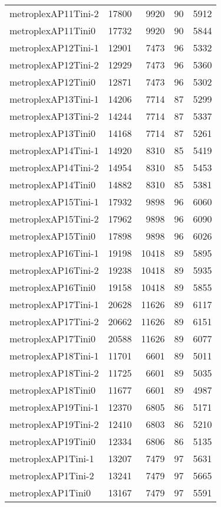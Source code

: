 \begin{longtable}{lrrrr}
metroplexAP11Tini-2 & 17800 & 9920 & 90 & 5912 \\
metroplexAP11Tini0 & 17732 & 9920 & 90 & 5844 \\
metroplexAP12Tini-1 & 12901 & 7473 & 96 & 5332 \\
metroplexAP12Tini-2 & 12929 & 7473 & 96 & 5360 \\
metroplexAP12Tini0 & 12871 & 7473 & 96 & 5302 \\
metroplexAP13Tini-1 & 14206 & 7714 & 87 & 5299 \\
metroplexAP13Tini-2 & 14244 & 7714 & 87 & 5337 \\
metroplexAP13Tini0 & 14168 & 7714 & 87 & 5261 \\
metroplexAP14Tini-1 & 14920 & 8310 & 85 & 5419 \\
metroplexAP14Tini-2 & 14954 & 8310 & 85 & 5453 \\
metroplexAP14Tini0 & 14882 & 8310 & 85 & 5381 \\
metroplexAP15Tini-1 & 17932 & 9898 & 96 & 6060 \\
metroplexAP15Tini-2 & 17962 & 9898 & 96 & 6090 \\
metroplexAP15Tini0 & 17898 & 9898 & 96 & 6026 \\
metroplexAP16Tini-1 & 19198 & 10418 & 89 & 5895 \\
metroplexAP16Tini-2 & 19238 & 10418 & 89 & 5935 \\
metroplexAP16Tini0 & 19158 & 10418 & 89 & 5855 \\
metroplexAP17Tini-1 & 20628 & 11626 & 89 & 6117 \\
metroplexAP17Tini-2 & 20662 & 11626 & 89 & 6151 \\
metroplexAP17Tini0 & 20588 & 11626 & 89 & 6077 \\
metroplexAP18Tini-1 & 11701 & 6601 & 89 & 5011 \\
metroplexAP18Tini-2 & 11725 & 6601 & 89 & 5035 \\
metroplexAP18Tini0 & 11677 & 6601 & 89 & 4987 \\
metroplexAP19Tini-1 & 12370 & 6805 & 86 & 5171 \\
metroplexAP19Tini-2 & 12410 & 6803 & 86 & 5210 \\
metroplexAP19Tini0 & 12334 & 6806 & 86 & 5135 \\
metroplexAP1Tini-1 & 13207 & 7479 & 97 & 5631 \\
metroplexAP1Tini-2 & 13241 & 7479 & 97 & 5665 \\
metroplexAP1Tini0 & 13167 & 7479 & 97 & 5591 \\

\end{longtable}

